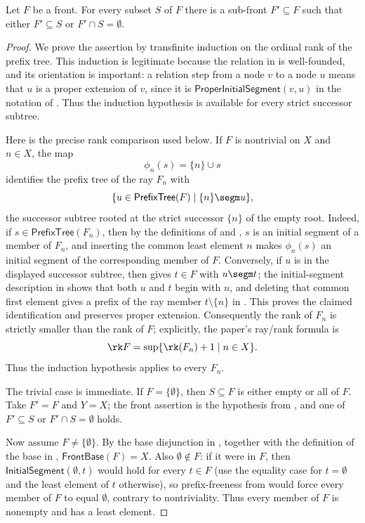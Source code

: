 \begin{theorem}
Let $F$ be a front.  For every subset $S$ of $F$ there is a sub-front
$F'\subseteq F$ such that either $F'\subseteq S$ or
$F'\cap S=\emptyset$.
\end{theorem}
\begin{proof}
We prove the assertion by transfinite induction on the ordinal rank of the
prefix tree.  This induction is legitimate because the relation in
 is well-founded, and its orientation is
important: a relation step from a node $v$ to a node $u$ means that $u$ is a
proper extension of $v$, since it is
\(\mathsf{ProperInitialSegment}(v,u)\) in the notation of
.  Thus the induction hypothesis is available
for every strict successor subtree.

Here is the precise rank comparison used below.  If $F$ is nontrivial on
$X$ and $n\in X$, the map
\[
 \phi_n(s)=\{n\}\cup s
\]
identifies the prefix tree of the ray $F_n$ with
\[
 \{u\in\mathsf{PrefixTree}(F)\mid \{n\}\segm u\},
\]
the successor subtree rooted at the strict successor $\{n\}$ of the empty
root.  Indeed, if
$s\in\mathsf{PrefixTree}(F_n)$, then by the definitions of
 and , $s$ is an initial segment of a
member of $F_n$, and inserting the common least element $n$ makes
$\phi_n(s)$ an initial segment of the corresponding member of $F$.
Conversely, if $u$ is in the displayed successor subtree, then
 gives $t\in F$ with $u\segm t$; the initial-segment
description in  shows that both $u$ and $t$ begin
with $n$, and deleting that common first element gives a prefix of the ray
member $t\setminus\{n\}$ in .  This proves the claimed
identification and preserves proper extension.  Consequently the rank of
$F_n$ is strictly smaller than the rank of $F$; explicitly, the paper's
ray/rank formula is
\[
 \rk F=\sup\{\rk(F_n)+1\mid n\in X\}.
\]
Thus the induction hypothesis applies to every $F_n$.

The trivial case is immediate.  If $F=\{\emptyset\}$, then
$S\subseteq F$ is either empty or all of $F$.  Take $F'=F$ and $Y=X$;
the front assertion is the hypothesis from , and one of
$F'\subseteq S$ or $F'\cap S=\emptyset$ holds.

Now assume $F\ne\{\emptyset\}$.  By the base disjunction in
, together with the definition of the base in
, $\mathsf{FrontBase}(F)=X$.  Also $\emptyset\notin F$:
if it were in $F$, then \(\mathsf{InitialSegment}(\emptyset,t)\) would
hold for every $t\in F$ (use the equality case for $t=\emptyset$ and the
least element of $t$ otherwise), so prefix-freeness from
 would force every member of $F$ to equal $\emptyset$,
contrary to nontriviality.  Thus every member of $F$ is nonempty and has a
least element.


\end{proof}
